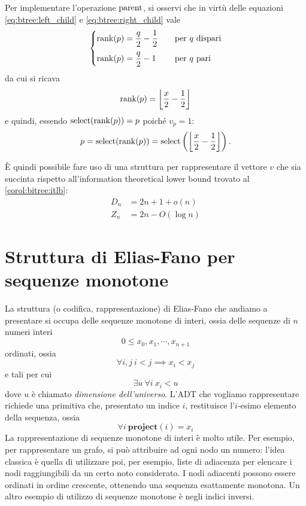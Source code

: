 Per implementare l'operazione $\mathrm{parent}$, si osservi che in virtù delle equazioni \ref{eq:btree:left_child} e \ref{eq:btree:right_child} vale
\begin{equation*}
	\begin{cases}
		\mathrm{rank}(p)=\dfrac{q}{2}-\dfrac12 & \quad\text{per $q$ dispari} \\[2ex]
		\mathrm{rank}(p)=\dfrac{q}{2}-1        & \quad\text{per $q$ pari}
	\end{cases}
\end{equation*}
da cui si ricava
\begin{equation*}
	\mathrm{rank}(p)=\left\lfloor \frac x2-\frac 12 \right\rfloor
\end{equation*}
e quindi, essendo $\mathrm{select}(\mathrm{rank}(p))=p$ poiché $v_p=1$:
\begin{equation*}
	p=\mathrm{select}(\mathrm{rank}(p))=\mathrm{select}\left(\left\lfloor \frac x2-\frac 12 \right\rfloor\right) \text.
\end{equation*}

È quindi possibile fare uso di una struttura per rappresentare il vettore $v$ che sia succinta rispetto all'information theoretical lower bound trovato al \cref{corol:bitree:itlb}:
\begin{align*}
	D_n & = 2n+1+o(n)    \\
	Z_n & = 2n-O(\log n)
\end{align*}



\section{Struttura di Elias-Fano per sequenze monotone}
La struttura (o codifica, rappresentazione) di Elias-Fano che andiamo
a presentare si occupa delle sequenze monotone di interi, ossia
delle sequenze di $n$ numeri interi
$$
	0 \leq x_0, x_1, \cdots, x_{n+1}
$$
ordinati, ossia
$$
	\forall i, j ~ i < j \implies x_i < x_j
$$
e tali per cui
$$
	\exists u ~ \forall i ~ x_i < u
$$
dove $u$ è chiamato \textit{dimensione dell'universo}.
L'ADT che vogliamo rappresentare richiede una primitiva
che, presentato un indice $i$, restituisce l'$i$-esimo elemento della sequenza,
ossia
$$
	\forall i ~ \mathbf{project}(i) = x_i
$$
La rappresentazione di sequenze monotone di interi è molto utile.
Per esempio, per rappresentare un grafo, si può attribuire ad ogni
nodo un numero: l'idea classica è quella di utilizzare poi, per esempio,
liste di adiacenza per elencare i nodi raggiungibili da un certo noto
considerato. I nodi adiacenti possono essere ordinati in ordine crescente,
ottenendo una sequenza esattamente monotona.
Un altro esempio di utilizzo di sequenze monotone è negli indici inversi.


